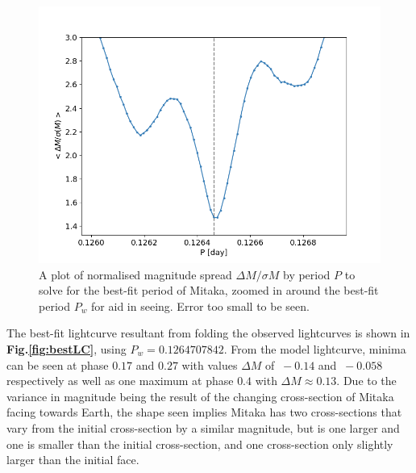 \documentclass[10pt,twocolumn]{revtex4}    %
\newcommand{\reffig}[1]{\textbf{Fig.#1}}
\begin{document}
\begin{figure}
    \centering
    \includegraphics[width = \linewidth]{FastSolveAllPeriodZoomed.png}
    \caption{A plot of normalised magnitude spread $\Delta M/\sigma M$ by period $P$ to solve for the best-fit period of Mitaka, zoomed in around the best-fit period $P_w$ for aid in seeing. Error too small to be seen.}
    \label{fig:findP}
\end{figure}

The best-fit lightcurve resultant from folding the observed lightcurves is shown in \reffig{\ref{fig:bestLC}}, using $P_w = 0.1264707842$. From the model lightcurve, minima can be seen at phase $0.17$ and $0.27$ with values $\Delta M$ of $~-0.14$ and $~-0.058$ respectively as well as one maximum at phase $0.4$ with $\Delta M \approx 0.13$. Due to the variance in magnitude being the result of the changing cross-section of Mitaka facing towards Earth, the shape seen implies Mitaka has two cross-sections that vary from the initial cross-section by a similar magnitude, but is one larger and one is smaller than the initial cross-section, and one cross-section only slightly larger than the initial face. 
\end{document}
